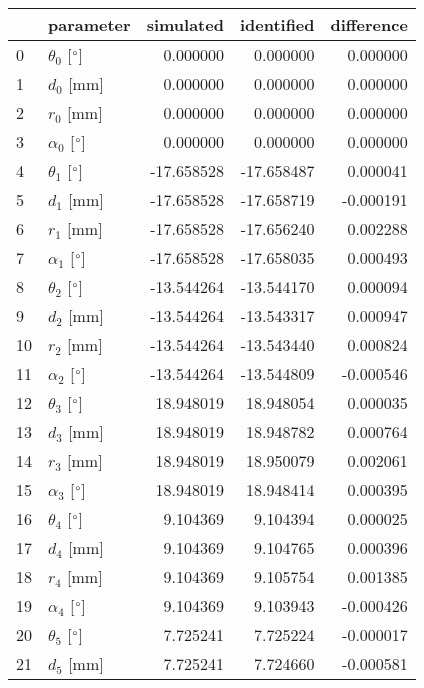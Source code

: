 \documentclass{standalone}%
\begin{document}
%
\normalsize%
\begin{tabular}{llrrr}
\toprule
{} &                 parameter &  simulated & identified & difference \\
\midrule
0  &  $\theta_{0}$ [$\degree$] &   0.000000 &   0.000000 &   0.000000 \\
1  &              $d_{0}$ [mm] &   0.000000 &   0.000000 &   0.000000 \\
2  &              $r_{0}$ [mm] &   0.000000 &   0.000000 &   0.000000 \\
3  &  $\alpha_{0}$ [$\degree$] &   0.000000 &   0.000000 &   0.000000 \\
4  &  $\theta_{1}$ [$\degree$] & -17.658528 & -17.658487 &   0.000041 \\
5  &              $d_{1}$ [mm] & -17.658528 & -17.658719 &  -0.000191 \\
6  &              $r_{1}$ [mm] & -17.658528 & -17.656240 &   0.002288 \\
7  &  $\alpha_{1}$ [$\degree$] & -17.658528 & -17.658035 &   0.000493 \\
8  &  $\theta_{2}$ [$\degree$] & -13.544264 & -13.544170 &   0.000094 \\
9  &              $d_{2}$ [mm] & -13.544264 & -13.543317 &   0.000947 \\
10 &              $r_{2}$ [mm] & -13.544264 & -13.543440 &   0.000824 \\
11 &  $\alpha_{2}$ [$\degree$] & -13.544264 & -13.544809 &  -0.000546 \\
12 &  $\theta_{3}$ [$\degree$] &  18.948019 &  18.948054 &   0.000035 \\
13 &              $d_{3}$ [mm] &  18.948019 &  18.948782 &   0.000764 \\
14 &              $r_{3}$ [mm] &  18.948019 &  18.950079 &   0.002061 \\
15 &  $\alpha_{3}$ [$\degree$] &  18.948019 &  18.948414 &   0.000395 \\
16 &  $\theta_{4}$ [$\degree$] &   9.104369 &   9.104394 &   0.000025 \\
17 &              $d_{4}$ [mm] &   9.104369 &   9.104765 &   0.000396 \\
18 &              $r_{4}$ [mm] &   9.104369 &   9.105754 &   0.001385 \\
19 &  $\alpha_{4}$ [$\degree$] &   9.104369 &   9.103943 &  -0.000426 \\
20 &  $\theta_{5}$ [$\degree$] &   7.725241 &   7.725224 &  -0.000017 \\
21 &              $d_{5}$ [mm] &   7.725241 &   7.724660 &  -0.000581 \\

\end{tabular}
\end{document}
